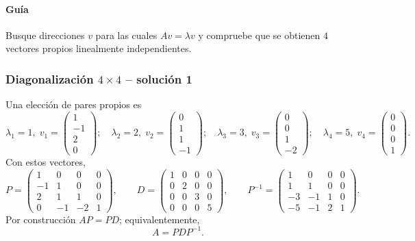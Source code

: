 \paragraph{Guía}
Busque direcciones $v$ para las cuales $Av=\lambda v$ y compruebe que se obtienen $4$ vectores propios linealmente independientes.



\subsubsection*{Diagonalización $4\times 4$ -- solución 1}
\scriptsize
Una elección de pares propios es
\[
\lambda_1=1,\;v_1=\begin{pmatrix}1\\-1\\2\\0\end{pmatrix};\quad \lambda_2=2,\;v_2=\begin{pmatrix}0\\1\\1\\-1\end{pmatrix};\quad \lambda_3=3,\;v_3=\begin{pmatrix}0\\0\\1\\-2\end{pmatrix};\quad \lambda_4=5,\;v_4=\begin{pmatrix}0\\0\\0\\1\end{pmatrix}.
\]
Con estos vectores,
\[
P=\begin{pmatrix}1 & 0 & 0 & 0\\-1 & 1 & 0 & 0\\2 & 1 & 1 & 0\\0 & -1 & -2 & 1\end{pmatrix},\qquad D=\begin{pmatrix}1 & 0 & 0 & 0\\0 & 2 & 0 & 0\\0 & 0 & 3 & 0\\0 & 0 & 0 & 5\end{pmatrix},\qquad P^{-1}=\begin{pmatrix}1 & 0 & 0 & 0\\1 & 1 & 0 & 0\\-3 & -1 & 1 & 0\\-5 & -1 & 2 & 1\end{pmatrix}.
\]
Por construcción $AP=PD$; equivalentemente,
\[
\boxed{A=PDP^{-1}}.
\]


